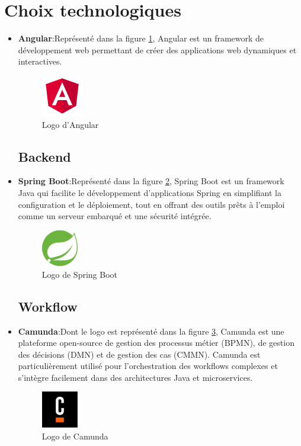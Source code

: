 \section{Choix technologiques}
\begin{itemize}
 \subsection{Frontend}
\item \textbf{Angular}:Représenté dans la figure \ref{fig:angular}, Angular est un framework de développement web permettant de créer des applications web dynamiques et interactives.
 \begin{figure}[h]
    \centering
    \includegraphics[width=1.8cm]{images/angular.png}
    \caption{Logo d'Angular}
    \label{fig:angular}
\end{figure}
 \subsection{Backend}
\item \textbf{Spring Boot}:Représenté dans la figure \ref{fig:SpringBoot}, Spring Boot est un framework Java qui facilite le développement d’applications Spring en simplifiant la configuration et le déploiement, tout en offrant des outils prêts à l’emploi comme un serveur embarqué et une sécurité intégrée.
 \begin{figure}[h]
    \centering
    \includegraphics[width=1.6cm]{images/SpringBoot.png}
    \caption{Logo de Spring Boot}
    \label{fig:SpringBoot}
\end{figure}
\subsection{Workflow}
\item \textbf{Camunda}:Dont le logo est représenté dans la figure \ref{fig:camunda}, Camunda est une plateforme open-source de gestion des processus métier (BPMN), de gestion des décisions (DMN) et de gestion des cas (CMMN). Camunda est particulièrement utilisé pour l'orchestration des workflows complexes et s'intègre facilement dans des architectures Java et microservices.
 \begin{figure}[h]
    \centering
    \includegraphics[width=1.6cm]{images/camunda.png}
    \caption{Logo de Camunda}
    \label{fig:camunda}
\end{figure}
\newpage

\end{itemize}
